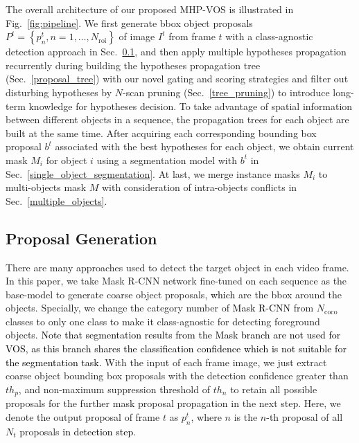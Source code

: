 \documentclass[10pt,twocolumn,letterpaper]{article}
\newcommand{\ldz}[1]{\textcolor{black}{#1}}
\begin{document}
The overall architecture of our proposed MHP-VOS is illustrated in Fig.~\ref{fig:pipeline}. We first generate bbox object proposals ${P^{t}} = \left\{ {p_n^{t},n = 1, \ldots ,{N_{\text{roi}}}} \right\}$ of image ${I^{t}}$ from frame $t$ with a class-agnostic detection approach in Sec.~\ref{proposal_generation}, and then apply multiple hypotheses propagation recurrently during building the hypotheses propagation tree (Sec.~\ref{proposal_tree}) with our novel gating and scoring strategies and filter out disturbing hypotheses by $N$-scan pruning (Sec.~\ref{tree_pruning}) to introduce long-term knowledge for hypotheses decision. To take advantage of spatial information between different objects in a sequence, the propagation trees for each object are built at the same time. After acquiring each corresponding bounding box proposal ${b^{t}}$ associated with the best hypotheses for each object, we obtain current mask ${M_i}$ for object $i$ using a segmentation model with ${b^{t}}$ in Sec.~\ref{single_object_segmentation}. At last, we merge instance masks ${M_i}$ to multi-objects mask $M$ with consideration of intra-objects conflicts in Sec.~\ref{multiple_objects}.




\subsection{Proposal Generation}
\label{proposal_generation}
\vspace{-5pt}

There are many approaches \cite{ren2017faster, he2017mask} used to detect the target object in each video frame. In this paper, we take Mask R-CNN \cite{he2017mask} network fine-tuned on each sequence
as the base-model to generate coarse object proposals, \ldz{which} are the bbox around the objects. Specially, we change the category number of \ldz{Mask R-CNN} from $N_{\text{coco}}$ classes to only one class to make it class-agnostic for detecting foreground objects. 
\ldz{Note that segmentation results from the Mask branch are not used for VOS, as this branch shares the classification confidence which is not suitable for the segmentation task.}
With the input of each frame image,  we just extract coarse object bounding box proposals with the detection confidence greater than $th_{p}$, and non-maximum suppression threshold of $th_{n}$ to retain all possible proposals for the further mask proposal propagation in the next step. Here, we denote the output proposal of frame $t$ as $p_n^{t}$, where $n$ is the $n$-th proposal of all $N_{t}$ proposals \ldz{in detection step}.
\end{document}
